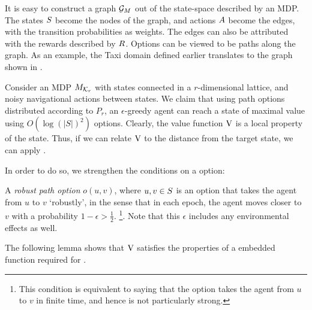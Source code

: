 It is easy to construct a graph $\mathcal{G}_{M}$ out of the state-space
described by an MDP. The states $S$ become the nodes of the graph,
and actions $A$ become the edges, with the transition
probabilities as weights. The edges can also be attributed with the
rewards described by $R$. Options can be viewed to be paths along
the graph. As an example, the Taxi domain defined earlier translates to
the graph shown in .

Consider an MDP $M_{\mathcal{K}_r}$ with states connected in
a $r$-dimensional lattice, and noisy navigational actions between
states. We claim that using path options distributed according to $P_r$,
an $\epsilon$-greedy agent can reach a state of maximal value using
$O(\log(|S|)^2)$ options. Clearly, the value function $\operatorname{V}$ is a local
property of the state. Thus, if we can relate $\operatorname{V}$ to the distance from
the target state, we can apply .

In order to do so, we strengthen the conditions on a option: 
\begin{definition}
    A {\em robust path option} $o(u,v)$, where $u,v \in S$ is an
    option that takes the agent from $u$ to $v$ `robustly', in the
    sense that in each epoch, the agent moves closer to $v$ with a
    probability $1-\epsilon > \frac{1}{2}$. \footnote{This condition
    is equivalent to saying that the option takes the agent from $u$
    to $v$ in finite time, and hence is not particularly strong.}.
    Note that this $\epsilon$ includes any environmental effects as
    well.
\end{definition}

The following lemma shows that $\operatorname{V}$ satisfies the properties of a
embedded function required for . 

